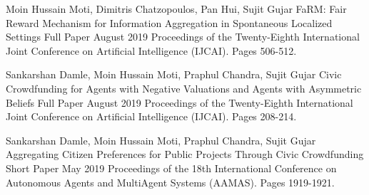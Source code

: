 


\begin{cventries}

    \cventry
    {Moin Hussain Moti, Dimitris Chatzopoulos, Pan Hui, Sujit Gujar} %
    {FaRM: Fair Reward Mechanism for Information Aggregation in Spontaneous Localized Settings} %
    {Full Paper} %
    {August 2019} %
    {
        Proceedings of the Twenty-Eighth International Joint Conference on Artificial Intelligence (IJCAI). Pages 506-512.
    }

    \cventry
    {Sankarshan Damle, Moin Hussain Moti, Praphul Chandra, Sujit Gujar} %
    {Civic Crowdfunding for Agents with Negative Valuations and Agents with Asymmetric Beliefs} %
    {Full Paper} %
    {August 2019} %
    {
        Proceedings of the Twenty-Eighth International Joint Conference on Artificial Intelligence (IJCAI). Pages 208-214.
    }

    \cventry
    {Sankarshan Damle, Moin Hussain Moti, Praphul Chandra, Sujit Gujar} %
    {Aggregating Citizen Preferences for Public Projects Through Civic Crowdfunding} %
    {Short Paper} %
    {May 2019} %
    {
        Proceedings of the 18th International Conference on Autonomous Agents and MultiAgent Systems (AAMAS). Pages 1919-1921.
    }


\end{cventries}


